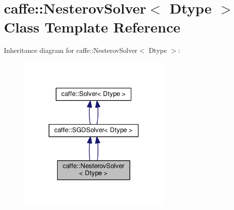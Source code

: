 \hypertarget{classcaffe_1_1_nesterov_solver}{}\section{caffe\+:\+:Nesterov\+Solver$<$ Dtype $>$ Class Template Reference}
\label{classcaffe_1_1_nesterov_solver}


Inheritance diagram for caffe\+:\+:Nesterov\+Solver$<$ Dtype $>$\+:
\nopagebreak
\begin{figure}[H]
\begin{center}
\leavevmode
\includegraphics[width=218pt]{classcaffe_1_1_nesterov_solver__inherit__graph}
\end{center}
\end{figure}
